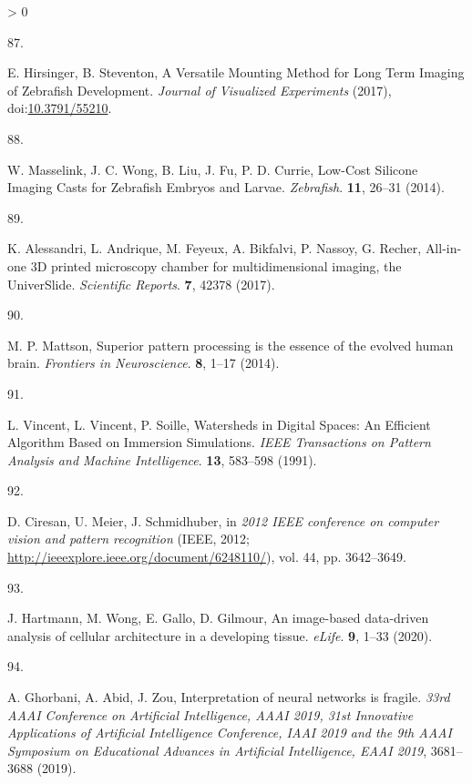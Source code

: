 \documentclass[10pt, b5paper, singlespacinge, twoside]{reedthesis} %
\newlength{\cslhangindent}
\newlength{\csllabelwidth}
\newenvironment{CSLReferences}[3] %
  {%
    \setlength{\parindent}{0pt}
    \ifodd #1 \everypar{\setlength{\hangindent}{\cslhangindent}}\ignorespaces\fi
    \ifnum #2 > 0
    \setlength{\parskip}{#2\baselineskip}
    \fi
  }%
  {}
\newcommand{\CSLLeftMargin}[1]{\parbox[t]{\maxof{\widthof{#1}}{\csllabelwidth}}{#1}}
\newcommand{\CSLRightInline}[1]{\parbox[t]{\linewidth}{#1}}
\theoremstyle{definition}
\theoremstyle{definition}
\theoremstyle{definition}
\theoremstyle{remark}
\begin{document}
\begin{CSLReferences}{0}{0}
\leavevmode\hypertarget{ref-Hirsinger2017}{}%
\CSLLeftMargin{87. }
\CSLRightInline{E. Hirsinger, B. Steventon, {A Versatile Mounting Method for Long Term Imaging of Zebrafish Development}. \emph{Journal of Visualized Experiments} (2017), doi:\href{https://doi.org/10.3791/55210}{10.3791/55210}.}

\leavevmode\hypertarget{ref-Masselink2014}{}%
\CSLLeftMargin{88. }
\CSLRightInline{W. Masselink, J. C. Wong, B. Liu, J. Fu, P. D. Currie, {Low-Cost Silicone Imaging Casts for Zebrafish Embryos and Larvae}. \emph{Zebrafish}. \textbf{11}, 26--31 (2014).}

\leavevmode\hypertarget{ref-Alessandri2017}{}%
\CSLLeftMargin{89. }
\CSLRightInline{K. Alessandri, L. Andrique, M. Feyeux, A. Bikfalvi, P. Nassoy, G. Recher, {All-in-one 3D printed microscopy chamber for multidimensional imaging, the UniverSlide}. \emph{Scientific Reports}. \textbf{7}, 42378 (2017).}

\leavevmode\hypertarget{ref-Mattson2014}{}%
\CSLLeftMargin{90. }
\CSLRightInline{M. P. Mattson, {Superior pattern processing is the essence of the evolved human brain}. \emph{Frontiers in Neuroscience}. \textbf{8}, 1--17 (2014).}

\leavevmode\hypertarget{ref-Vincent1991}{}%
\CSLLeftMargin{91. }
\CSLRightInline{L. Vincent, L. Vincent, P. Soille, {Watersheds in Digital Spaces: An Efficient Algorithm Based on Immersion Simulations}. \emph{IEEE Transactions on Pattern Analysis and Machine Intelligence}. \textbf{13}, 583--598 (1991).}

\leavevmode\hypertarget{ref-Ueda1993}{}%
\CSLLeftMargin{92. }
\CSLRightInline{D. Ciresan, U. Meier, J. Schmidhuber, in \emph{2012 IEEE conference on computer vision and pattern recognition} (IEEE, 2012; \url{http://ieeexplore.ieee.org/document/6248110/}), vol. 44, pp. 3642--3649.}

\leavevmode\hypertarget{ref-Hartmann2020}{}%
\CSLLeftMargin{93. }
\CSLRightInline{J. Hartmann, M. Wong, E. Gallo, D. Gilmour, {An image-based data-driven analysis of cellular architecture in a developing tissue}. \emph{eLife}. \textbf{9}, 1--33 (2020).}

\leavevmode\hypertarget{ref-Ghorbani2019}{}%
\CSLLeftMargin{94. }
\CSLRightInline{A. Ghorbani, A. Abid, J. Zou, {Interpretation of neural networks is fragile}. \emph{33rd AAAI Conference on Artificial Intelligence, AAAI 2019, 31st Innovative Applications of Artificial Intelligence Conference, IAAI 2019 and the 9th AAAI Symposium on Educational Advances in Artificial Intelligence, EAAI 2019}, 3681--3688 (2019).}


\end{CSLReferences}
\end{document}
